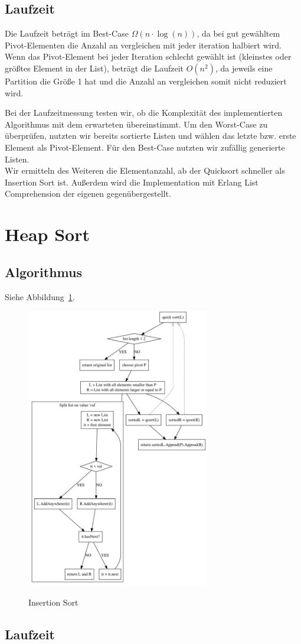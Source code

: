 \documentclass[11pt]{article}
\begin{document}
    \subsection{Laufzeit}\label{subsec:Qlaufzeit}

    Die Laufzeit beträgt im Best-Case \(\Omega (n \cdot \log(n))\), da bei
    gut gewähltem Pivot-Elementen die Anzahl an vergleichen mit jeder
    iteration halbiert wird.
    Wenn das Pivot-Element bei jeder Iteration schlecht gewählt ist (kleinstes
    oder größtes Element in der List), beträgt die Laufzeit \(O(n^2)\), da
    jeweils eine Partition die Größe 1 hat und die Anzahl an vergleichen
    somit nicht reduziert wird.

    Bei der Laufzeitmessung testen wir, ob die Komplexität des implementierten
    Algorithmus mit dem erwarteten übereinstimmt.
    Um den Worst-Case zu überprüfen, nutzten wir bereits sortierte Listen und
    wählen das letzte bzw. erste Element als Pivot-Element.
    Für den Best-Case nutzten wir zufällig generierte Listen.\\
    Wir ermitteln des Weiteren die Elementanzahl, ab der Quicksort schneller
    als Insertion Sort ist.
    Außerdem wird die Implementation mit Erlang List Comprehension der
    eigenen gegenübergestellt.


    \section{Heap Sort}\label{sec:heap-sort}

    \subsection{Algorithmus}\label{subsec:Halgorithmus}
    Siehe Abbildung~\ref{fig:hsort}.


    \begin{figure}[hbt]
        \caption{Insertion Sort}
        \centering
        \includegraphics[width = 8cm]{qsort.pdf}\label{fig:hsort}
    \end{figure}

    \subsection{Laufzeit}\label{subsec:Hlaufzeit}
\end{document}
